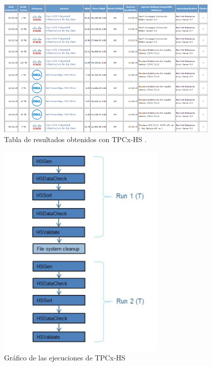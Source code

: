 \documentclass[10pt]{article}
\begin{document}
			
	\begin{figure}[H]
		\centering
		\includegraphics[width=0.95\textwidth]{./images/examples.png}
		\caption{Tabla de resultados obtenidos con TPCx-HS \cite{ejemplos}.} 
		\label{fig:ejemplo}
	\end{figure}
	
	\begin{figure}[H]
		\centering
		\includegraphics[width=8cm]{./images/executionsTPC.png}
		\caption{Gráfico de las ejecuciones de TPCx-HS} 
		\label{fig:ejecucionesTPC}
	\end{figure}
\end{document}
